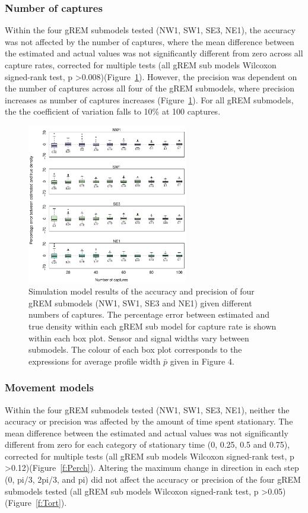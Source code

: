 \documentclass[a4paper,10pt,reqno,oneside]{amsart}
\begin{document}
\subsubsection*{Number of captures}

Within the four gREM submodels tested (NW1, SW1, SE3, NE1), the  accuracy was not affected by the number of captures, where the mean difference between the estimated and actual values was not significantly different from zero across all capture rates, corrected for multiple tests (all gREM sub models Wilcoxon signed-rank test, p \textgreater 0.008)(Figure~\ref{f:Captures}). However, the precision was dependent on the number of captures across all four of the gREM submodels, where precision increases as number of captures increases (Figure~\ref{f:Captures}). For all gREM submodels, the the coefficient of variation falls to 10\% at 100 captures. 

\begin{figure}[t]
       \centering
	\includegraphics[width=7cm]{imgs/ResultsNoCaptures.pdf}
        \caption{Simulation model results of the accuracy and precision of four gREM submodels (NW1, SW1, SE3 and NE1) given different numbers of captures. The percentage error between estimated and true density within each gREM sub model for capture rate is shown within each box plot. Sensor and signal widths vary between submodels. The colour of each box plot corresponds to the expressions for average profile width $\bar{p}$ given in Figure 4. }            
	\label{f:Captures}
\end{figure}



\subsubsection*{Movement models}

Within the four gREM submodels tested (NW1, SW1, SE3, NE1), neither the  accuracy or precision was affected by the amount of time spent stationary. The mean difference between the estimated and actual values was not significantly different from zero for each category of stationary time (0, 0.25, 0.5 and 0.75), corrected for multiple tests (all gREM sub models Wilcoxon signed-rank test, p \textgreater 0.12)(Figure~\ref{f:Perch}). Altering the maximum change in direction in each step (0, pi/3, 2pi/3, and pi) did not affect the accuracy or precision of the four gREM submodels tested (all gREM sub models Wilcoxon signed-rank test, p \textgreater 0.05)(Figure~\ref{f:Tort}). 
\end{document}
